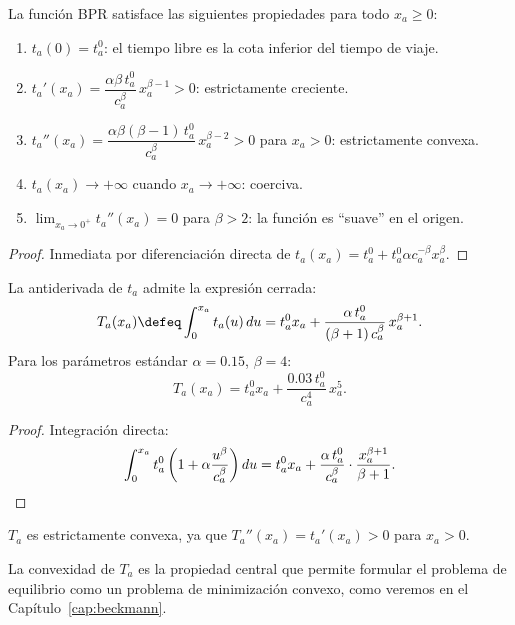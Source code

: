 \begin{proposition}\label{prop:bpr_properties}
La función BPR satisface las siguientes propiedades para todo $x_a \geq 0$:
\begin{enumerate}
    \item $t_a(0) = t_a^0$: el tiempo libre es la cota inferior del tiempo de viaje.
    \item $t_a'(x_a) = \dfrac{\alpha \beta \, t_a^0}{c_a^\beta} \, x_a^{\beta-1} > 0$: estrictamente creciente.
    \item $t_a''(x_a) = \dfrac{\alpha \beta (\beta-1) \, t_a^0}{c_a^\beta} \, x_a^{\beta-2} > 0$ para $x_a > 0$: estrictamente convexa.
    \item $t_a(x_a) \to +\infty$ cuando $x_a \to +\infty$: coerciva.
    \item $\lim_{x_a \to 0^+} t_a''(x_a) = 0$ para $\beta > 2$: la función es ``suave'' en el origen.
\end{enumerate}
\end{proposition}

\begin{proof}
Inmediata por diferenciación directa de $t_a(x_a) = t_a^0 + t_a^0 \alpha c_a^{-\beta} x_a^\beta$.
\end{proof}

\begin{proposition}\label{prop:bpr_integral}
La antiderivada de $t_a$ admite la expresión cerrada:
\[
T_a(x_a) \defeq \int_0^{x_a} t_a(u) \, du = t_a^0 x_a + \frac{\alpha \, t_a^0}{(\beta+1) \, c_a^\beta} \, x_a^{\beta+1}.
\]
Para los parámetros estándar $\alpha = 0.15$, $\beta = 4$:
\[
T_a(x_a) = t_a^0 x_a + \frac{0.03 \, t_a^0}{c_a^4} \, x_a^5.
\]
\end{proposition}

\begin{proof}
Integración directa:
\[
\int_0^{x_a} t_a^0\left(1 + \alpha \frac{u^\beta}{c_a^\beta}\right) du = t_a^0 x_a + \frac{\alpha \, t_a^0}{c_a^\beta} \cdot \frac{x_a^{\beta+1}}{\beta+1}. \qedhere
\]
\end{proof}

\begin{corollary}
$T_a$ es estrictamente convexa, ya que $T_a''(x_a) = t_a'(x_a) > 0$ para $x_a > 0$.
\end{corollary}

\begin{remark}
La convexidad de $T_a$ es la propiedad central que permite formular el problema de equilibrio como un problema de minimización convexo, como veremos en el Capítulo~\ref{cap:beckmann}.
\end{remark}

